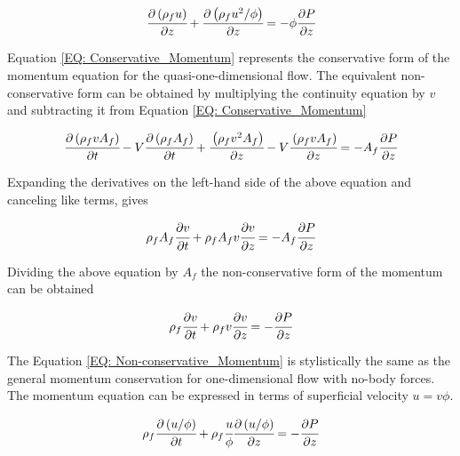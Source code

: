 \documentclass[../Article_Sensitivity_Analsysis.tex]{subfiles}
\begin{document}
	{\footnotesize
		\begin{equation}
			\cfrac{\partial \left( \rho_f u \right)}{\partial z} + \cfrac{\partial \left( \rho_f u^2/\phi \right) }{\partial z} = -\phi \cfrac{\partial 	P}{\partial z}
		\end{equation}
	}

	Equation \ref{EQ: Conservative_Momentum} represents the conservative form of the momentum equation for the quasi-one-dimensional flow. The equivalent non-conservative form can be obtained by multiplying the continuity equation by $v$ and subtracting it from Equation \ref{EQ: Conservative_Momentum}
	
	{\footnotesize
		\begin{equation}
			\cfrac{\partial \left( \rho_f v A_f \right)}{\partial t} - V\cfrac{ \partial \left( \rho_f A_f \right) }{\partial t} + \cfrac{\left( \rho_f v^2 A_f 	\right)}{\partial z} - V \cfrac{\left( \rho_f v A_f \right)}{\partial z} = -A_f \cfrac{\partial P}{\partial z}
		\end{equation}
	}
	
	Expanding the derivatives on the left-hand side of the above equation and canceling like terms, gives

	{\footnotesize
		\begin{equation}
			\rho_f A_f \cfrac{\partial v}{\partial t} + \rho_f A_f v \cfrac{\partial v}{\partial z} = -A_f \cfrac{\partial P}{\partial z}
		\end{equation}
	}

	Dividing the above equation by $A_f$ the non-conservative form of the momentum can be obtained
	
	{\footnotesize
		\begin{equation}
			\rho_f \cfrac{\partial v}{\partial t} + \rho_f v \cfrac{\partial v}{\partial z} = -\cfrac{\partial P}{\partial z}
			\label{EQ: Non-conservative_Momentum}
		\end{equation}
	}

	The Equation \ref{EQ: Non-conservative_Momentum} is stylistically the same as the general momentum conservation for one-dimensional flow with no-body forces. The momentum equation can be expressed in terms of superficial velocity $u=v\phi$. 
	
	{\footnotesize
		\begin{equation}
			\rho_f \cfrac{\partial \left(u / \phi \right)}{\partial t} + \rho_f \cfrac{u}{\phi} \cfrac{\partial \left( u / \phi \right)}{\partial z} = - \cfrac{\partial P}{\partial z}
		\end{equation}
	}
\end{document}
